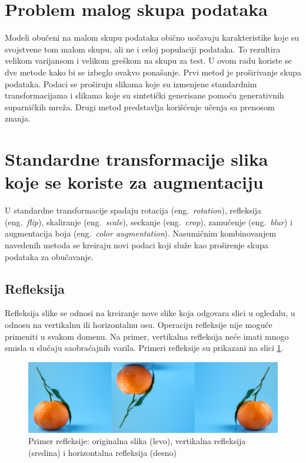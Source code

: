 \documentclass[12pt,oneside]{memoir}
\begin{document}


\section{Problem malog skupa podataka}

Modeli obučeni na malom skupu podataka obično uočavaju karakteristike koje su svojstvene tom malom skupu, ali ne i celoj populaciji podataka. To rezultira velikom varijansom i velikom greškom na skupu za test. U ovom radu koriste se dve metode kako bi se izbeglo ovakvo ponašanje. Prvi metod je proširivanje skupa podataka.
Podaci se proširuju slikama koje su izmenjene standardnim transformacijama i slikama koje su sintetički generisane pomoću generativnih suparničkih mreža.
Drugi metod predstavlja korišćenje učenja sa prenosom znanja.


\section{Standardne transformacije slika koje se koriste za augmentaciju}
\label{section3_increasedata_bas}
U standardne transformacije spadaju rotacija (eng.~\textit{rotation}), refleksija (eng.~\textit{flip}), skaliranje (eng.~\textit{scale}), seckanje (eng.~\textit{crop}), zamućenje (eng.~\textit{blur}) i augmentacija boja (eng.~\textit{color augmentation}).
Nasumičnim kombinovanjem navedenih metoda se kreiraju novi podaci koji služe kao proširenje skupa podataka za obučavanje. 

\subsection{Refleksija}
Refleksija slike se odnosi na kreiranje nove slike koja odgovara slici u ogledalu, u odnosu na vertikalnu ili horizontalnu osu. Operaciju refleksije nije moguće primeniti u svakom domenu. Na primer, vertikalna refleksija neće imati mnogo smisla u slučaju saobraćajnih vozila. Primeri refleksije su prikazani na slici \ref{fig:section3_flip}. 

\begin{figure}[ht]
    \centering
    \includegraphics[width=1\textwidth]{matfmaster/glava3/flip.jpg}
    \caption{Primer refleksije: originalna slika (levo), vertikalna refleksija (sredina) i horizontalna refleksija (desno) \cite{unsplashOrange}}
    \label{fig:section3_flip}
\end{figure}
\end{document}
